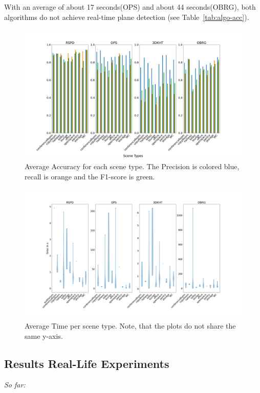 \documentclass[main.tex]{subfiles}
\begin{document}
With an average of about 17 seconds(OPS) and about 44 seconds(OBRG), both algorithms do not achieve real-time plane detection (see Table~\ref{tab:algo-acc}).


\begin{figure}[]
    \centering
    \includegraphics[width=15 cm]{images/accuracy_total.png}
    \caption[Accuracy Results S3DIS]{Average Accuracy for each scene type. The Precision
        is colored blue, recall is orange and the F1-score is green.}
    \label{fig:stanfordaccuracy}
\end{figure}

\begin{figure}[]
    \centering
    \includegraphics[width=15 cm]{images/times_violin.png}
    \caption[Time Results S3DIS]{Average Time per scene type. Note, that the plots
        do not share the same y-axis.}
    \label{fig:violintime}
\end{figure}

\subsection{Results Real-Life Experiments}
\textit{So far:}
\end{document}
